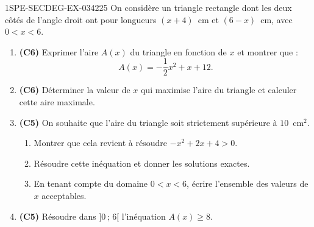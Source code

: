 \begin{exercice}{1SPE-SECDEG-EX-034}{2}{25}
On considère un triangle rectangle dont les deux côtés de l'angle droit ont pour longueurs $(x+4)$~cm et $(6-x)$~cm, avec $0 < x < 6$.

\begin{enumerate}
  \item \textbf{(C6)} Exprimer l'aire $A(x)$ du triangle en fonction de $x$ et montrer que :
  \[A(x) = -\dfrac{1}{2}x^2 + x + 12.\]

  \item \textbf{(C6)} Déterminer la valeur de $x$ qui maximise l'aire du triangle et calculer cette aire maximale.

  \item \textbf{(C5)} On souhaite que l'aire du triangle soit strictement supérieure à $10$~cm$^2$.
  \begin{enumerate}
    \item Montrer que cela revient à résoudre $-x^2 + 2x + 4 > 0$.
    \item Résoudre cette inéquation et donner les solutions exactes.
    \item En tenant compte du domaine $0 < x < 6$, écrire l'ensemble des valeurs de $x$ acceptables.
  \end{enumerate}

  \item \textbf{(C5)} Résoudre dans $]0\,;\,6[$ l'inéquation $A(x) \geqslant 8$.
\end{enumerate}
\end{exercice}
